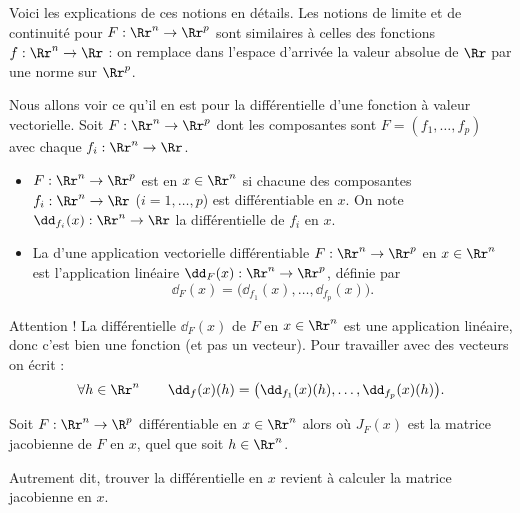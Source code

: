 \documentclass[12pt, class=report,crop=false]{standalone}
\begin{document}
\bigskip

Voici les explications de ces notions en détails.
Les notions de limite et de continuité pour $F : \Rr^n \to \Rr^p$ sont similaires à celles des fonctions $f : \Rr^n \to \Rr$ : on remplace dans l'espace d'arrivée la valeur absolue de $\Rr$ par une norme sur $\Rr^p$.


Nous allons voir ce qu'il en est pour la différentielle d'une fonction à valeur vectorielle. Soit $F : \Rr^n \to \Rr^p$ dont les composantes sont $F = (f_1,\ldots,f_p)$
 avec chaque $f_i : \Rr^n \to \Rr$.
 

\begin{definition}
\sauteligne
\begin{itemize}
  \item $F : \Rr^n \to \Rr^p$ est  en $x \in \Rr^n$ si chacune des composantes   $f_i : \Rr^n \to \Rr$ ($i=1,\ldots,p$) est différentiable en $x$.
  On note $\dd_{f_i} (x) : \Rr^n \to \Rr$ la différentielle de $f_i$ en $x$.

  \item La  d'une application vectorielle différentiable $F : \Rr^n \to \Rr^p$ en $x \in \Rr^n$ est l'application linéaire $\dd_F(x) : \Rr^n \to \Rr^p$, définie par 
$$\dd_F (x) = \big( \dd_{f_1} (x), \ldots, \dd_{f_p} (x) \big).$$ 
\end{itemize}
\end{definition}


Attention ! La différentielle $\dd_F(x)$ de $F$ en $x \in \Rr^n$ est une application linéaire, donc c'est bien une fonction (et pas un vecteur).
Pour travailler avec des vecteurs on écrit :
$$\forall h \in \Rr^n \qquad \dd_f (x)(h) = \big( \dd_{f_1} (x)(h), \ldots, \dd_{f_p} (x)(h) \big).$$ 


\begin{proposition}
Soit $F : \Rr^n \to \R^p$ différentiable en $x \in \Rr^n$ alors
où $J_F (x)$ est la matrice jacobienne de $F$ en $x$, quel que soit $h\in\Rr^n$.
\end{proposition}


Autrement dit, trouver la différentielle en $x$ revient à calculer la matrice jacobienne en $x$.
\end{document}
